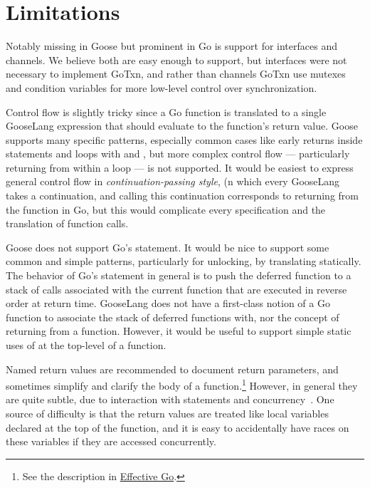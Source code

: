 \section{Limitations}%
\label{sec:goose:limitations}

Notably missing in Goose but prominent in Go is support for interfaces
and channels. We believe both are easy enough to support, but interfaces
were not necessary to implement GoTxn, and rather than channels GoTxn
use mutexes and condition variables for more low-level control over
synchronization.

Control flow is slightly tricky since a Go function is translated
to a single GooseLang expression that should evaluate to the function's
return value. Goose supports many specific patterns, especially common
cases like early returns inside  statements and loops with
 and , but more complex control flow ---
particularly returning from within a loop --- is not supported. It would be
easiest to express general control flow in \emph{continuation-passing style}, (n which
every GooseLang takes a continuation, and calling this continuation corresponds
to returning from the function in Go, but this
would complicate every specification and the translation of function calls.

Goose does not support Go's  statement. It would be nice to support some
common and simple patterns, particularly for unlocking, by translating
 statically. The behavior of Go's  statement in general is
to push the deferred function to a stack of calls associated with the current function that are executed in reverse order at return
time. GooseLang does not have a first-class notion of a Go function to associate
the stack of deferred functions with, nor the concept of returning
from a function. However, it would be useful to support simple static uses of 
at the top-level of a function.

Named return values are recommended to document return parameters, and sometimes
simplify and clarify the body of a function.\footnote{See the description in
\href{https://go.dev/doc/effective_go\#named-results}{Effective Go}.} However, in
general they are quite subtle, due to interaction with  statements and
concurrency~\cite{chabbi:golang-races}. One source of difficulty is that the
return values are treated like local variables declared at the top of the
function, and it is easy to accidentally have races on these variables if they
are accessed concurrently.

